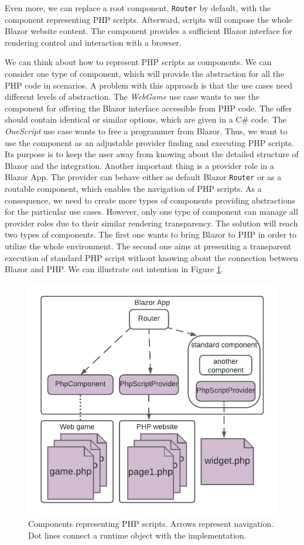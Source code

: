 Even more, we can replace a root component, \texttt{Router} by default, with the component representing PHP scripts.
Afterward, scripts will compose the whole Blazor website content.
The component provides a sufficient Blazor interface for rendering control and interaction with a browser. 
\par
We can think about how to represent PHP scripts as components.
We can consider one type of component, which will provide the abstraction for all the PHP code in scenarios.
A problem with this approach is that the use cases need different levels of abstraction.
The \textit{WebGame} use case wants to use the component for offering the Blazor interface accessible from PHP code.
The offer should contain identical or similar options, which are given in a C\# code.
The \textit{OneScript} use case wants to free a programmer from Blazor.
Thus, we want to use the component as an adjustable provider finding and executing PHP scripts.
Its purpose is to keep the user away from knowing about the detailed structure of Blazor and the integration.
Another important thing is a provider role in a Blazor App.
The provider can behave either as default Blazor \texttt{Router} or as a routable component, which enables the navigation of PHP scripts.
As a consequence, we need to create more types of components providing abstractions for the particular use cases.
However, only one type of component can manage all provider roles due to their similar rendering transparency.
The solution will reach two types of components.
The first one wants to bring Blazor to PHP in order to utilize the whole environment.
The second one aims at presenting a transparent execution of standard PHP script without knowing about the connection between Blazor and PHP.
We can illustrate out intention in Figure \ref{img12:component}.
\par
\begin{figure}[!b]\centering
\includegraphics[scale=0.9]{./img/Components}
\caption{Components representing PHP scripts. Arrows represent navigation. 
Dot lines connect a runtime object with the implementation.
}
\label{img12:component}
\end{figure} 
